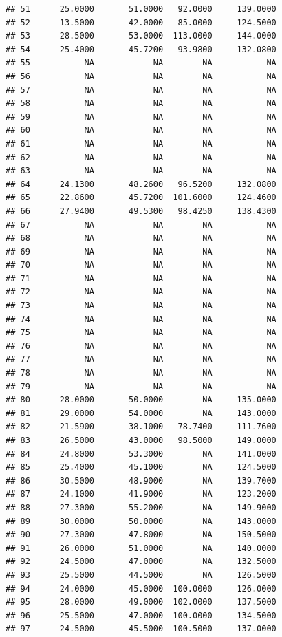 \documentclass[]{article}
\begin{document}
\begin{verbatim}
## 51      25.0000       51.0000   92.0000     139.0000
## 52      13.5000       42.0000   85.0000     124.5000
## 53      28.5000       53.0000  113.0000     144.0000
## 54      25.4000       45.7200   93.9800     132.0800
## 55           NA            NA        NA           NA
## 56           NA            NA        NA           NA
## 57           NA            NA        NA           NA
## 58           NA            NA        NA           NA
## 59           NA            NA        NA           NA
## 60           NA            NA        NA           NA
## 61           NA            NA        NA           NA
## 62           NA            NA        NA           NA
## 63           NA            NA        NA           NA
## 64      24.1300       48.2600   96.5200     132.0800
## 65      22.8600       45.7200  101.6000     124.4600
## 66      27.9400       49.5300   98.4250     138.4300
## 67           NA            NA        NA           NA
## 68           NA            NA        NA           NA
## 69           NA            NA        NA           NA
## 70           NA            NA        NA           NA
## 71           NA            NA        NA           NA
## 72           NA            NA        NA           NA
## 73           NA            NA        NA           NA
## 74           NA            NA        NA           NA
## 75           NA            NA        NA           NA
## 76           NA            NA        NA           NA
## 77           NA            NA        NA           NA
## 78           NA            NA        NA           NA
## 79           NA            NA        NA           NA
## 80      28.0000       50.0000        NA     135.0000
## 81      29.0000       54.0000        NA     143.0000
## 82      21.5900       38.1000   78.7400     111.7600
## 83      26.5000       43.0000   98.5000     149.0000
## 84      24.8000       53.3000        NA     141.0000
## 85      25.4000       45.1000        NA     124.5000
## 86      30.5000       48.9000        NA     139.7000
## 87      24.1000       41.9000        NA     123.2000
## 88      27.3000       55.2000        NA     149.9000
## 89      30.0000       50.0000        NA     143.0000
## 90      27.3000       47.8000        NA     150.5000
## 91      26.0000       51.0000        NA     140.0000
## 92      24.5000       47.0000        NA     132.5000
## 93      25.5000       44.5000        NA     126.5000
## 94      24.0000       45.0000  100.0000     126.0000
## 95      28.0000       49.0000  102.0000     137.5000
## 96      25.5000       47.0000  100.0000     134.5000
## 97      24.5000       45.5000  100.5000     137.0000

\end{verbatim}
\end{document}

